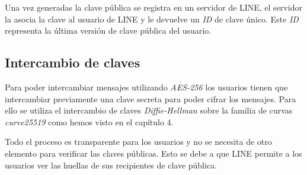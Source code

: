 Una vez generadas la clave pública se registra en un servidor de LINE, el servidor la asocia la clave al usuario de LINE y le devuelve un \emph{ID} de clave único. Este \emph{ID} representa la última versión de clave pública del usuario. 

\subsection{Intercambio de claves}
Para poder intercambiar mensajes utilizando \emph{AES-256} los usuarios tienen que intercambiar previamente una clave secreta para poder cifrar los mensajes. Para ello se utiliza el intercambio de claves \emph{Diffie-Hellman} sobre la familia de curvas \emph{curve25519} como hemos visto en el capítulo 4.

Todo el proceso es transparente para los usuarios y no se necesita de otro elemento para verificar las claves públicas. Esto se debe a que LINE permite a los usuarios ver las huellas de sus recipientes de clave pública.

